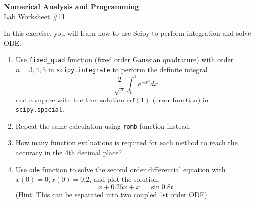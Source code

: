 \documentclass[12pt]{article}
\begin{document}
\begin{center}
\Large
\textbf{Numerical Analysis and Programming}\\
\large
Lab Worksheet \#11
\end{center}
In this exercise, you will learn how to use Scipy to perform integration and solve ODE.
\begin{enumerate}
\item Use {\tt fixed\_quad} function (fixed order Gaussian quadrature) with order $n=3,4,5$ in {\tt scipy.integrate} to perform the definite integral
\[
\frac{2}{\sqrt{\pi}}\int_0^1 e^{-x^2} dx
\]
and compare with the true solution $\mathrm{erf}(1)$ (error function) in {\tt scipy.special}.
\item Repeat the same calculation using {\tt romb} function instead. 
\item How many function evaluations is required for each method to reach the accuracy in the 4th decimal place? 
\item Use {\tt ode} function to solve the second order differential equation with $x(0)=0, \dot{x}(0)=0.2$, and plot the solution,
\[
\ddot{x}+0.25\dot{x}+x=\sin 0.8 t
\]
(Hint: This can be separated into two coupled 1st order ODE)
\end{enumerate}
\end{document}
